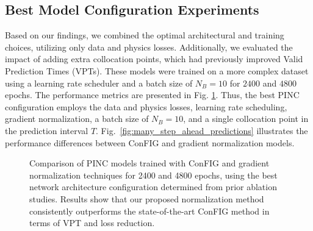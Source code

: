 \documentclass[conference]{IEEEtran}
\begin{document}
{\subsection{Best Model Configuration Experiments}
\label{subsec:best_confs}

Based on our findings, we combined the optimal architectural and training choices, utilizing only data and physics losses. Additionally, we evaluated the impact of adding extra collocation points, which had previously improved Valid Prediction Times (VPTs).
These models were trained on a more complex dataset using a learning rate scheduler and a batch size of $N_B=10$ for $2400$ and $4800$ epochs. The performance metrics are presented in Fig. \ref{fig:final_results}. 
Thus, the best PINC configuration employs the data and physics losses, learning rate scheduling, gradient normalization, a batch size of $N_B=10$, and a single collocation point in the prediction interval $T$.
Fig.~\ref{fig:many_step_ahead_predictions} illustrates the performance differences between ConFIG and gradient normalization models.

\begin{figure}[!t]

    \caption{Comparison of PINC models trained with ConFIG and gradient normalization techniques for 2400 and 4800 epochs, using the best network architecture configuration determined from prior ablation studies. Results show that our proposed normalization method consistently outperforms the state-of-the-art ConFIG method in terms of VPT and loss reduction.}
    \label{fig:final_results}
\end{figure}







}
\end{document}
